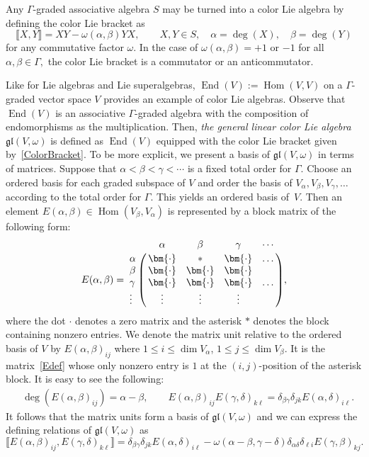 \documentclass[pdftex]{sigma}
\numberwithin{equation}{section}
\theoremstyle{definition}
\def\gl{\mathfrak{gl}}
\begin{document}
Any $\Gamma$-graded associative algebra $ S$ may be turned into a color Lie algebra by defining the color Lie bracket as
\begin{equation}
	\llbracket X, Y \rrbracket = XY - \omega(\alpha,\beta) YX, \qquad
	X, Y \in S, \quad \alpha = \deg(X),\quad \beta = \deg(Y)
	\label{ColorBracket}
\end{equation}
for any commutative factor $\omega.$
In the case of $ \omega(\alpha,\beta) = +1 $ or $ -1$ for all $\alpha, \beta \in \Gamma, $ the color Lie bracket is a commutator or an anticommutator.

Like for Lie algebras and Lie superalgebras, $ \operatorname{End}(V) := \operatorname{Hom}(V,V)$ on a $\Gamma$-graded vector space $V$ provides an example of color Lie algebras.
Observe that $\operatorname{End}(V)$ is an associative $\Gamma$\nobreakdash-graded algebra with the composition of endomorphisms as the multiplication.
Then, \textit{the general linear color Lie algebra} $ \gl(V,\omega)$ is defined as $\operatorname{End}(V)$ equipped with the color Lie bracket given by~\eqref{ColorBracket}.
To be more explicit, we present a basis of $\gl(V,\omega)$ in terms of matrices.
Suppose that $ \alpha < \beta < \gamma < \cdots $ is a fixed total order for $\Gamma.$
Choose an ordered basis for each graded subspace of $V$ and order the basis of $ V_{\alpha}, V_{\beta}, V_{\gamma}, \dots $ according to the total order for $\Gamma.$
This yields an ordered basis of~$V$.
Then an element $E(\alpha,\beta) \in \operatorname{Hom}(V_{\beta}, V_{\alpha})$ is represented by a block matrix of the following form:
\begin{equation}
	E(\alpha,\beta)=
	\bordermatrix{ & \alpha & \beta & \gamma & \cdots \cr
		\alpha & \bm{\cdot} & \ast & \bm{\cdot} & \ldots \cr
		\beta & \bm{\cdot} & \bm{\cdot} & \bm{\cdot} \cr
		\gamma & \bm{\cdot} & \bm{\cdot} & \bm{\cdot} & \ldots \cr
		\vdots & \vdots & \vdots & \vdots & \cr
	},
	\label{Edef}
\end{equation}
where the dot $\bm{\cdot}$ denotes a zero matrix and the asterisk $\ast$ denotes the block containing nonzero entries.
We denote the matrix unit relative to the ordered basis of $V$ by $ E(\alpha,\beta)_{ij} $ where $ 1 \leq i \leq \dim V_{\alpha}$, $1 \leq j \leq \dim V_{\beta}$. It is the matrix~\eqref{Edef} whose only nonzero entry is $1$ at the $(i,j)$-position of the asterisk block.
It is easy to see the following:
\begin{align*}
	&\deg(E(\alpha,\beta)_{ij})= \alpha - \beta,
	\qquad
	E(\alpha,\beta)_{ij} E(\gamma,\delta)_{k\ell}= \delta_{\beta\gamma} \delta_{jk} E(\alpha,\delta)_{i\ell}.
\end{align*}
It follows that the matrix units form a basis of $\gl(V,\omega)$ and we can express the defining relations of $\gl(V,\omega)$ as
\begin{equation*}
	\llbracket E(\alpha,\beta)_{ij}, E(\gamma,\delta)_{k\ell} \rrbracket =
	\delta_{\beta\gamma} \delta_{jk} E(\alpha,\delta)_{i\ell} - \omega(\alpha-\beta,\gamma-\delta) \delta_{\alpha\delta} \delta_{\ell i} E(\gamma,\beta)_{kj}.
\end{equation*}
\end{document}
